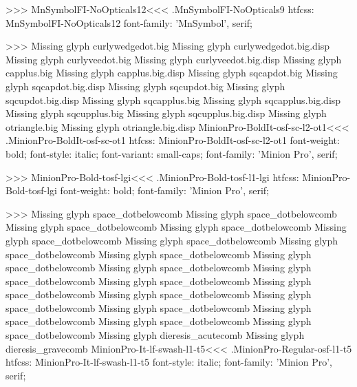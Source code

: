 {>>>
\<MnSymbolFI-NoOpticals12\><<<
.MnSymbolFI-NoOpticals9
htfcss:  MnSymbolFI-NoOpticals12  font-family: 'MnSymbol', serif;

>>>
Missing glyph	curlywedgedot.big
Missing glyph	curlywedgedot.big.disp
Missing glyph	curlyveedot.big
Missing glyph	curlyveedot.big.disp
Missing glyph	capplus.big
Missing glyph	capplus.big.disp
Missing glyph	sqcapdot.big
Missing glyph	sqcapdot.big.disp
Missing glyph	sqcupdot.big
Missing glyph	sqcupdot.big.disp
Missing glyph	sqcapplus.big
Missing glyph	sqcapplus.big.disp
Missing glyph	sqcupplus.big
Missing glyph	sqcupplus.big.disp
Missing glyph	otriangle.big
Missing glyph	otriangle.big.disp
\<MinionPro-BoldIt-osf-sc-l2-ot1\><<<
.MinionPro-BoldIt-osf-sc-ot1
htfcss:  MinionPro-BoldIt-osf-sc-l2-ot1  font-weight: bold; font-style: italic; font-variant: small-caps; font-family: 'Minion Pro', serif;

>>>
\<MinionPro-Bold-tosf-lgi\><<<
.MinionPro-Bold-tosf-l1-lgi
htfcss:  MinionPro-Bold-tosf-lgi  font-weight: bold; font-family: 'Minion Pro', serif;

>>>
Missing glyph	space_dotbelowcomb
Missing glyph	space_dotbelowcomb
Missing glyph	space_dotbelowcomb
Missing glyph	space_dotbelowcomb
Missing glyph	space_dotbelowcomb
Missing glyph	space_dotbelowcomb
Missing glyph	space_dotbelowcomb
Missing glyph	space_dotbelowcomb
Missing glyph	space_dotbelowcomb
Missing glyph	space_dotbelowcomb
Missing glyph	space_dotbelowcomb
Missing glyph	space_dotbelowcomb
Missing glyph	space_dotbelowcomb
Missing glyph	space_dotbelowcomb
Missing glyph	space_dotbelowcomb
Missing glyph	space_dotbelowcomb
Missing glyph	space_dotbelowcomb
Missing glyph	space_dotbelowcomb
Missing glyph	space_dotbelowcomb
Missing glyph	dieresis_acutecomb
Missing glyph	dieresis_gravecomb
\<MinionPro-It-lf-swash-l1-t5\><<<
.MinionPro-Regular-osf-l1-t5
htfcss:  MinionPro-It-lf-swash-l1-t5  font-style: italic; font-family: 'Minion Pro', serif;

}
